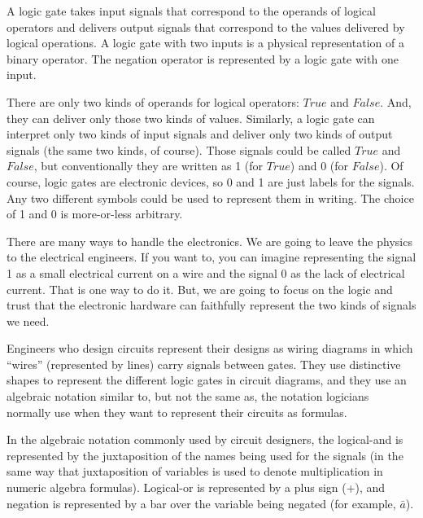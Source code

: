 A logic gate takes input signals that correspond
to the operands of logical operators and delivers output signals
that correspond to the values delivered by logical operations.
A logic gate with two inputs is a physical representation of
a binary operator. The negation operator is represented by a
logic gate with one input.

There are only two kinds of operands for logical operators: $True$ and $False$.
And, they can deliver only those two kinds of values.
Similarly, a logic gate can interpret only two kinds of input signals
and deliver only two kinds of output signals (the same two kinds, of course).
Those signals could be called $True$ and $False$,
but conventionally they are written as 1 (for $True$) and 0 (for $False$).
Of course, logic gates are electronic devices,
so 0 and 1 are just labels for the signals.
Any two different symbols could be used to represent them in writing.
The choice of 1 and 0 is more-or-less arbitrary.

There are many ways to handle the electronics.
We are going to leave the physics to the electrical engineers.
If you want to, you can imagine representing the signal 1 as
a small electrical current on a wire and the signal 0 as
the lack of electrical current.
That is one way to do it.
But, we are going to focus on the logic and trust that
the electronic hardware can faithfully represent the two
kinds of signals we need.

Engineers who design circuits represent their designs as wiring diagrams
in which ``wires'' (represented by lines) carry signals between gates.
They use distinctive shapes to represent the different logic gates in
circuit diagrams,
and they use an algebraic notation similar to, but
not the same as, the notation logicians normally use when they want
to represent their circuits as formulas.

In the algebraic notation commonly used by circuit
designers, the logical-and is represented by the juxtaposition
of the names being used for the signals (in the same way
that juxtaposition of variables is used to denote multiplication
in numeric algebra formulas). Logical-or is represented by a plus sign (+),
and negation is represented by a bar over the variable being negated
(for example, $\bar{a}$).

